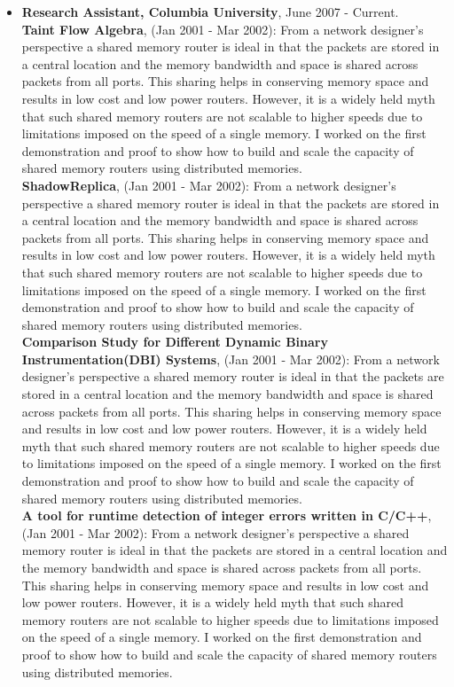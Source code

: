 \documentclass[10pt,a4]{article}
\begin{document}
\begin{small}
\begin{itemize}
\vspace{0.1cm}
\item  {\bf Research Assistant, Columbia University}, June 2007 - Current. \\
%
  {\bf Taint Flow Algebra}, (Jan 2001 - Mar 2002): From a network designer's
  perspective a shared memory router is ideal in that the packets are stored in
  a central location and the memory bandwidth and space is shared across packets
  from all ports. This sharing helps in conserving memory space and results in
  low cost and low power routers. However, it is a widely held myth that such
  shared memory routers are not scalable to higher speeds due to limitations
  imposed on the speed of a single memory. I worked on the first demonstration
  and proof to show how to build and scale the capacity of shared memory routers
  using distributed memories. \\
%
  {\bf ShadowReplica}, (Jan 2001 - Mar 2002): From a network designer's
  perspective a shared memory router is ideal in that the packets are stored in
  a central location and the memory bandwidth and space is shared across packets
  from all ports. This sharing helps in conserving memory space and results in
  low cost and low power routers. However, it is a widely held myth that such
  shared memory routers are not scalable to higher speeds due to limitations
  imposed on the speed of a single memory. I worked on the first demonstration
  and proof to show how to build and scale the capacity of shared memory routers
  using distributed memories. \\
%
  {\bf Comparison Study for Different Dynamic Binary Instrumentation(DBI)
    Systems}, (Jan 2001 - Mar 2002): From a network designer's perspective a
  shared memory router is ideal in that the packets are stored in a central
  location and the memory bandwidth and space is shared across packets from all
  ports. This sharing helps in conserving memory space and results in low cost
  and low power routers. However, it is a widely held myth that such shared
  memory routers are not scalable to higher speeds due to limitations imposed on
  the speed of a single memory. I worked on the first demonstration and proof to
  show how to build and scale the capacity of shared memory routers using
  distributed memories.\\
%
  {\bf A tool for runtime detection of integer errors written in C/C++}, (Jan
  2001 - Mar 2002): From a network designer's perspective a shared memory router
  is ideal in that the packets are stored in a central location and the memory
  bandwidth and space is shared across packets from all ports. This sharing
  helps in conserving memory space and results in low cost and low power
  routers. However, it is a widely held myth that such shared memory routers are
  not scalable to higher speeds due to limitations imposed on the speed of a
  single memory. I worked on the first demonstration and proof to show how to
  build and scale the capacity of shared memory routers using distributed
  memories.


\end{itemize}
\end{small}
\end{document}
